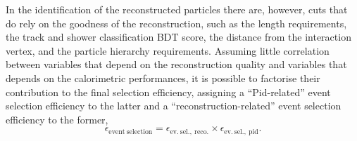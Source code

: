 In the identification of the reconstructed particles there are, however, cuts that do rely on the goodness of the reconstruction, such as the length requirements, the track and shower classification BDT score, the distance from the interaction vertex, and the particle hierarchy requirements. Assuming little correlation between variables that depend on the reconstruction quality and variables that depends on the calorimetric performances, it is possible to factorise their contribution to the final selection efficiency, assigning a ``Pid-related'' event selection efficiency to the latter and a ``reconstruction-related'' event selection efficiency to the former, \begin{equation}
    \epsilon_\mathrm{event\ selection} = \epsilon_\mathrm{ev.\ sel.,\ reco.} \times \epsilon_\mathrm{ev.\ sel.,\ pid}.
\end{equation} 

